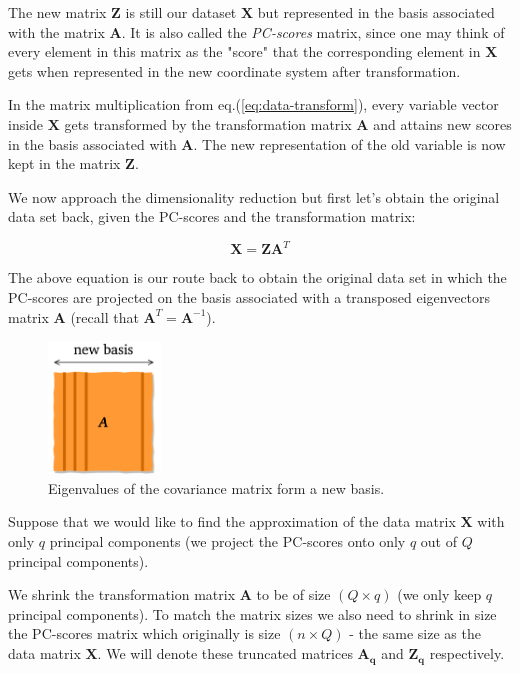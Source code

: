 \documentclass[10pt,twocolumn]{article}
\begin{document}
The new matrix $\bm{Z}$ is still our dataset $\bm{X}$ but represented in the basis associated with the matrix $\bm{A}$. It is also called the \textit{PC-scores} matrix, since one may think of every element in this matrix as the "score" that the corresponding element in $\bm{X}$ gets when represented in the new coordinate system after transformation.




In the matrix multiplication from eq.(\ref{eq:data-transform}), every variable vector inside $\bm{X}$ gets transformed by the transformation matrix $\bm{A}$ and attains new scores in the basis associated with $\bm{A}$. The new representation of the old variable is now kept in the matrix $\bm{Z}$.



We now approach the dimensionality reduction but first let's obtain the original data set back, given the PC-scores and the transformation matrix:

\begin{equation} \label{eq:X-retrieval}
\bm{X} = \bm{Z} \bm{A}^T
\end{equation}

The above equation is our route back to obtain the original data set in which the PC-scores are projected on the basis associated with a transposed eigenvectors matrix $\bm{A}$ (recall that $\bm{A}^T = \bm{A}^{-1}$).

\begin{figure}
\centering\includegraphics[width=3cm]{new-basis.png}
\caption{Eigenvalues of the covariance matrix form a new basis.}
\label{fig:new-basis}
\end{figure}

Suppose that we would like to find the approximation of the data matrix $\bm{X}$ with only $q$ principal components (we project the PC-scores onto only $q$ out of $Q$ principal components).

We shrink the transformation matrix $\bm{A}$ to be of size $(Q \times q)$ (we only keep $q$ principal components). To match the matrix sizes we also need to shrink in size the PC-scores matrix which originally is size $(n \times Q)$ - the same size as the data matrix $\bm{X}$. We will denote these truncated matrices $\bm{A_q}$ and $\bm{Z_q}$ respectively.
\end{document}
